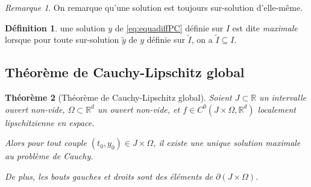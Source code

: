 \documentclass{report}
\newtheorem{thm}{Théorème}[chapter]
\theoremstyle{definition}
\newtheorem{déf}[thm]{Définition}
\theoremstyle{remark}
\newtheorem*{rmq}{Remarque}
\numberwithin{equation}{section}
\newcommand{\R}{\mathbb R}
\begin{document}
			\begin{rmq} On remarque qu'une solution est toujours sur-solution d'elle-même.
			\end{rmq}

			\begin{déf} une solution $y$ de \eqref{eq:equadiffPC} définie sur $I$ est dite \textit{maximale} lorsque pour toute sur-solution $\widetilde y$ de
			$y$ définie sur $\widetilde I$, on a $\widetilde I \subseteq I$.
			\end{déf}

		\subsection{Théorème de Cauchy-Lipschitz global}
			\begin{thm}[Théorème de Cauchy-Lipschitz global] Soient $J \subset \R$ un intervalle ouvert non-vide, $\Omega \subset \R^d$ un ouvert non-vide, et
			$f \in C^0(J \times \Omega, \R^d)$ localement lipschitzienne en espace.

			Alors pour tout couple $(t_0, y_0) \in J \times \Omega$, il existe une unique solution maximale au problème de Cauchy.

			De plus, les bouts gauches et droits sont des éléments de $\partial(J \times \Omega)$\footnotemark.
			\end{thm}
\end{document}
